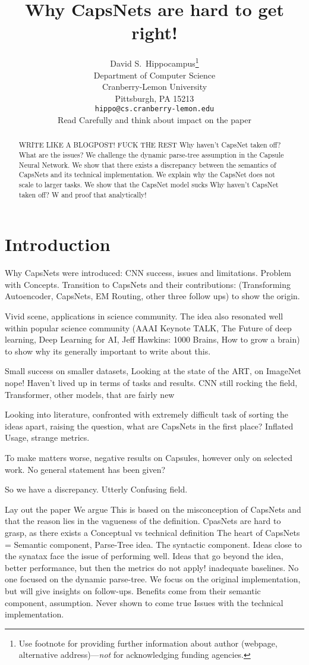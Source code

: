 \documentclass{article}
\title{                                                                                                                                          
	Why CapsNets are hard to get right!
}
\author{%
  David S.~Hippocampus\thanks{Use footnote for providing further information
    about author (webpage, alternative address)---\emph{not} for acknowledging
    funding agencies.} \\
  Department of Computer Science\\
  Cranberry-Lemon University\\
  Pittsburgh, PA 15213 \\
  \texttt{hippo@cs.cranberry-lemon.edu} \\Read Carefully and think about impact on the paper
}
\begin{document}
\maketitle

\begin{abstract}
  WRITE LIKE A BLOGPOST! FUCK THE REST 
  Why haven't CapsNet taken off? What are the issues?
  We challenge the dynamic parse-tree assumption in the Capsule Neural Network.
  We show that there exists a discrepancy between the semantics of CapsNets and its technical implementation.
  We explain why the CapsNet does not scale to larger tasks.
  We show that the CapsNet model sucks
  Why haven't CapsNet taken off? W and proof that analytically!
\end{abstract}

\section{Introduction}

Why CapsNets were introduced: CNN success, issues and limitations.
Problem with Concepts.
Transition to CapsNets and their contributions: (Transforming Autoencoder, CapsNets, EM Routing, other three follow ups) to show the origin.

Vivid scene, applications in science community.
The idea also resonated well within popular science community (AAAI Keynote TALK, The Future of deep learning, Deep Learning for AI, Jeff Hawkins: 1000 Brains, How to grow a brain) to show why its generally important to write about this.

Small success on smaller datasets, Looking at the state of the ART, on ImageNet nope!
Haven't lived up in terms of tasks and results.
CNN still rocking the field, Transformer, other models, that are fairly new

Looking into literature, confronted with extremely difficult task of sorting the ideas apart, raising the question, what are CapsNets in the first place? Inflated Usage, strange metrics.

To make matters worse, negative results on Capsules, however only on selected work. No general statement has been given?

So we have a discrepancy.
Utterly Confusing field.

Lay out the paper
We argue This is based on the misconception of CapsNets and that the reason lies in the vagueness of the definition.
CpasNets are hard to grasp, as there exists a Conceptual vs technical definition
The heart of CapsNets = Semantic component, Parse-Tree idea.
The syntactic component.
Ideas close to the synatax face the issue of performing well.
Ideas that go beyond the idea, better performance, but then the metrics do not apply! inadequate baselines.
No one focused on the dynamic parse-tree.
We focus on the original implementation, but will give insights on follow-ups.
Benefits come from their semantic component, assumption. Never shown to come true
Issues with the technical implementation.
\end{document}
